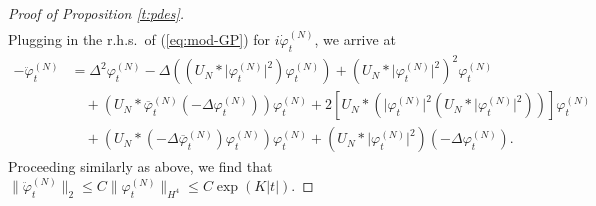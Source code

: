 \documentclass[11pt,a4paper]{article}
\newcommand{\ph}{\varphi_t^{(N)}}	%
\newcommand{\phdot}{\dot{\varphi}_t^{(N)}}	%
\newcommand{\phddot}{\ddot{\varphi}_t^{(N)}}	%
\begin{document}
\begin{proof}[Proof of Proposition \ref{t:pdes}]
\[\begin{split}
\end{split}\]
Plugging in the r.h.s.\ of (\ref{eq:mod-GP}) for $i\phdot$, we arrive at 
\begin{align*}
- \phddot & = \Delta^2 \ph - \Delta \left( (U_N \ast \lvert \ph\rvert^2)\ph \right) + \left( U_N \ast \lvert \ph\rvert^2 \right)^2 \ph \\
& \quad + (U_N \ast \overline{\varphi}_t^{(N)} (-\Delta \ph))\ph + 2 \left[ U_N \ast \left( \lvert \ph\rvert^2 (U_N \ast \lvert \ph\rvert^2) \right) \right] \ph \\
& \quad + (U_N \ast (-\Delta \overline{\varphi}_t^{(N)}) \ph ) \ph + \left( U_N \ast \lvert \ph \rvert^2 \right)(-\Delta \ph).
\end{align*}
Proceeding similarly as above, we find that $\| \ddot \varphi_t^{(N)} \|_{2} \leq C \| \varphi_t^{(N)} \|_{H^4} \leq C \exp (K |t|)$. 


\end{proof}
\end{document}
